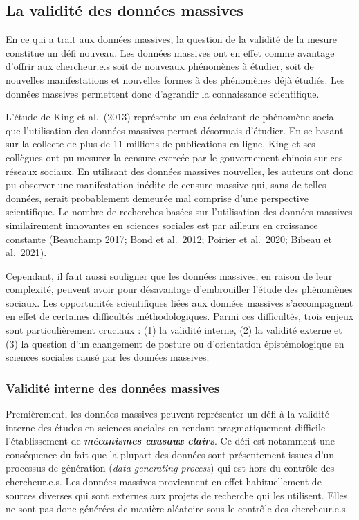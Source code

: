\documentclass[
  letterpaper,
]{scrbook}
\begin{document}
\hypertarget{la-validituxe9-des-donnuxe9es-massives}{%
\subsection{La validité des données
massives}\label{la-validituxe9-des-donnuxe9es-massives}}

En ce qui a trait aux données massives, la question de la validité de la
mesure constitue un défi nouveau. Les données massives ont en effet
comme avantage d'offrir aux chercheur.e.s soit de nouveaux phénomènes à
étudier, soit de nouvelles manifestations et nouvelles formes à des
phénomènes déjà étudiés. Les données massives permettent donc d'agrandir
la connaissance scientifique.

L'étude de King et al.~(2013) représente un cas éclairant de phénomène
social que l'utilisation des données massives permet désormais
d'étudier. En se basant sur la collecte de plus de 11 millions de
publications en ligne, King et ses collègues ont pu mesurer la censure
exercée par le gouvernement chinois sur ces réseaux sociaux. En
utilisant des données massives nouvelles, les auteurs ont donc pu
observer une manifestation inédite de censure massive qui, sans de
telles données, serait probablement demeurée mal comprise d'une
perspective scientifique. Le nombre de recherches basées sur
l'utilisation des données massives similairement innovantes en sciences
sociales est par ailleurs en croissance constante (Beauchamp 2017; Bond
et al.~2012; Poirier et al.~2020; Bibeau et al.~2021).

Cependant, il faut aussi souligner que les données massives, en raison
de leur complexité, peuvent avoir pour désavantage d'embrouiller l'étude
des phénomènes sociaux. Les opportunités scientifiques liées aux données
massives s'accompagnent en effet de certaines difficultés
méthodologiques. Parmi ces difficultés, trois enjeux sont
particulièrement cruciaux : (1) la validité interne, (2) la validité
externe et (3) la question d'un changement de posture ou d'orientation
épistémologique en sciences sociales causé par les données massives.

\hypertarget{validituxe9-interne-des-donnuxe9es-massives}{%
\subsubsection{Validité interne des données
massives}\label{validituxe9-interne-des-donnuxe9es-massives}}

Premièrement, les données massives peuvent représenter un défi à la
validité interne des études en sciences sociales en rendant
pragmatiquement difficile l'établissement de \textbf{\emph{mécanismes
causaux clairs}}. Ce défi est notamment une conséquence du fait que la
plupart des données sont présentement issues d'un processus de
génération (\emph{data-generating process}) qui est hors du contrôle des
chercheur.e.s. Les données massives proviennent en effet habituellement
de sources diverses qui sont externes aux projets de recherche qui les
utilisent. Elles ne sont pas donc générées de manière aléatoire sous le
contrôle des chercheur.e.s.
\end{document}
